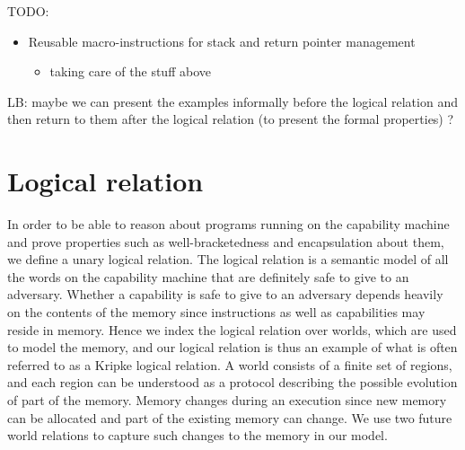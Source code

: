 \documentclass[compsoc,conference,letterpaper,fleqn]{IEEEtran}
\newcommand\lars[1]{{\color{purple} \sf \footnotesize {LB: #1}}\\}
\begin{document}
TODO:
\begin{itemize}
\item Reusable macro-instructions for stack and return pointer management
\begin{itemize}
\item taking care of the stuff above
\end{itemize}
\end{itemize}


\lars{maybe we can present the examples informally before the logical relation and then return to them after the logical relation (to present the formal properties) ?}

\section{Logical relation}
\label{sec:logical-relation}
In order to be able to reason about programs running on the capability
machine and prove properties such as well-bracketedness and
encapsulation about them, we define a unary logical relation.
The logical relation is a semantic model of all the words on the
capability machine that are definitely safe to give to an
adversary. Whether a capability is safe to give to an adversary
depends heavily on the contents of the memory since instructions as well
as capabilities may reside in memory. Hence we index the logical
relation over worlds, which are used to model the memory, and our logical
relation is thus an example of what is often referred to as a Kripke
logical relation. A world consists of a finite set of regions, and each region
can be understood as a protocol describing the possible evolution of
part of the memory. Memory changes during an
execution since new memory can be allocated and part of the existing
memory can change. We use two future world relations to capture
such changes to the memory in our model.
%
\end{document}
